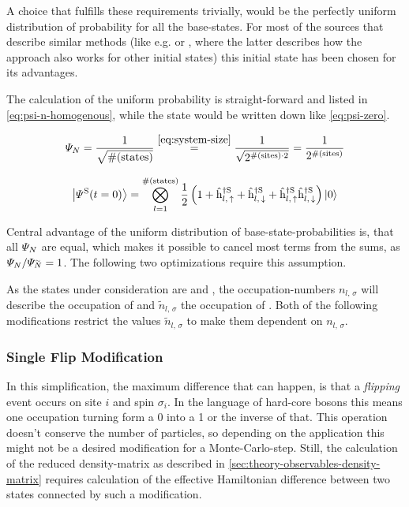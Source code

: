 A choice that fulfills these requirements trivially, would be the perfectly uniform distribution of probability for all the base-states.
For most of the sources that describe similar methods (like e.g. \cite{isingDynamicsWithClassicalNetworks} or \cite{variationalClassicalNetworksPaper}, where the latter describes how the approach also works for other initial states) this initial state has been chosen for its advantages.

The calculation of the uniform probability is straight-forward and listed in \autoref{eq:psi-n-homogenous}, while the state would be written down like \autoref{eq:psi-zero}.

\begin{equation}
    \label{eq:psi-n-homogenous}
    \psiN{} = \frac{1}{\sqrt{\text{\#}(\text{states})}} \stackrel{\ref{eq:system-size}}{=} \frac{1}{\sqrt{2^{\text{\#}(\text{sites}) \cdot 2}}} = \frac{1}{2^{\text{\#}(\text{sites})}}
\end{equation}

\begin{equation}
    \label{eq:psi-zero}
    \ketpsiof[\schroedingerPicture]{t=0} = \bigotimes\limits_{l=1}^{\text{\#}(\text{states})} \frac{1}{2} \left( 1 + \withspinhcop[\schroedingerPicture]{l}{\up}{\dagger} + \withspinhcop[\schroedingerPicture]{l}{\down}{\dagger} + \withspinhcop[\schroedingerPicture]{l}{\up}{\dagger}  \withspinhcop[\schroedingerPicture]{l}{\down}{\dagger} \right) \ketN[0]
\end{equation}

Central advantage of the uniform distribution of base-state-probabilities is, that all $\varPsi_{N}$ are equal, which makes it possible to cancel most terms from the sums, as $\psiN{}/\psiN[\vphantom{N}\smash{\tilde{N}}]{} = 1$.
The following two optimizations require this assumption.

As the states under consideration are \ketN[N] and , the occupation-numbers $n_{l,\,\sigma}$ will describe the occupation of \ketN[N] and $\tilde{n}_{l,\,\sigma}$ the occupation of .
Both of the following modifications restrict the values $\tilde{n}_{l,\,\sigma}$ to make them dependent on $n_{l,\,\sigma}$.

\subsubsection*{Single Flip Modification}

In this simplification, the maximum difference that can happen, is that a \emph{flipping} event occurs on site $i$ and spin $\sigma_i$. 
In the language of hard-core bosons this means one occupation turning form a 0 into a 1 or the inverse of that.
This operation doesn't conserve the number of particles, so depending on the application this might not be a desired modification for a Monte-Carlo-step.
Still, the calculation of the reduced density-matrix as described in \autoref{sec:theory-observables-density-matrix} requires calculation of the effective Hamiltonian difference between two states connected by such a modification.


